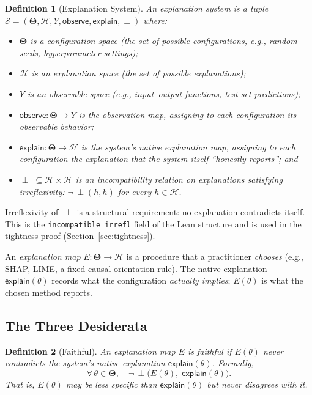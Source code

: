 \documentclass{article}
\newtheorem{definition}{Definition}
\newcommand{\Params}{\mathbf{\Theta}}         %
\newcommand{\sH}{\mathcal{H}}
\newcommand{\incomp}{\perp}                  %
\begin{document}
\begin{definition}[Explanation System]
\label{def:explanation-system}
An \emph{explanation system} is a tuple
$\mathcal{S} = (\Params, \sH, Y, \mathsf{observe}, \mathsf{explain}, \incomp)$ where:
\begin{itemize}
  \item $\Params$ is a \emph{configuration space} (the set of possible
    configurations, e.g., random seeds, hyperparameter settings);
  \item $\sH$ is an \emph{explanation space} (the set of possible explanations);
  \item $Y$ is an \emph{observable space} (e.g., input--output functions,
    test-set predictions);
  \item $\mathsf{observe}: \Params \to Y$ is the \emph{observation map}, assigning
    to each configuration its observable behavior;
  \item $\mathsf{explain}: \Params \to \sH$ is the system's \emph{native
    explanation map}, assigning to each configuration the explanation that the
    system itself ``honestly reports''; and
  \item $\incomp\;\subseteq \sH \times \sH$ is an \emph{incompatibility relation}
    on explanations satisfying \emph{irreflexivity}:
    $\neg\,\incomp(h, h)$ for every $h \in \sH$.
\end{itemize}
\end{definition}

Irreflexivity of~$\incomp$ is a structural requirement: no explanation
contradicts itself.  This is the \texttt{incompatible\_irrefl} field of the
Lean structure and is used in the tightness proof
(Section~\ref{sec:tightness}).

An \emph{explanation map} $E : \Params \to \sH$ is a procedure that a
practitioner \emph{chooses} (e.g., SHAP, LIME, a fixed causal orientation
rule).  The native explanation $\mathsf{explain}(\theta)$ records what the
configuration \emph{actually implies}; $E(\theta)$ is what the chosen method
reports.

\subsection{The Three Desiderata}

\begin{definition}[Faithful]
\label{def:faithful}
An explanation map $E$ is \emph{faithful} if $E(\theta)$ never contradicts the
system's native explanation $\mathsf{explain}(\theta)$.  Formally,
\[
  \forall\,\theta \in \Params,\quad
  \neg\,\incomp\bigl(E(\theta),\;\mathsf{explain}(\theta)\bigr).
\]
That is, $E(\theta)$ may be less specific than $\mathsf{explain}(\theta)$ but
never disagrees with it.
\end{definition}
\end{document}
